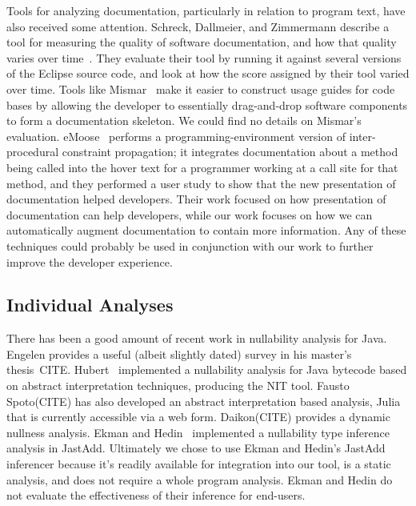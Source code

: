 Tools for analyzing documentation, particularly in relation to program text,
have also received some attention.  Schreck, Dallmeier, and Zimmermann describe
a tool for measuring the quality of software documentation, and how that
quality varies over time~\cite{evolvedoc}. They evaluate their tool by running
it against several versions of the Eclipse source code, and look at how the
score assigned by their tool varied over time.  Tools like Mismar~\cite{mismar} make
it easier to construct usage guides for code bases by allowing the developer to
essentially drag-and-drop software components to form a documentation skeleton.
We could find no details on Mismar's evaluation.
eMoose~\cite{emoose} performs a programming-environment version of
inter-procedural constraint propagation; it integrates
documentation about a method being called into the hover text for a programmer
working at a call site for that method, and they performed a user study to show
that the new presentation of documentation helped developers.  Their work
focused on how presentation of documentation can help developers, while our work
focuses on how we can automatically augment documentation to contain more
information.  Any of these
techniques could probably be used
in conjunction with our work to further improve the developer experience.

\subsection{Individual Analyses}

There has been a good amount of recent work in nullability analysis for Java.
Engelen provides a useful (albeit slightly dated) survey in his master's thesis~CITE.
Hubert~\cite{NIT} implemented a nullability
analysis for Java bytecode based on abstract interpretation
techniques, producing the {\sc NIT} tool.  Fausto Spoto(CITE) has also developed
an abstract interpretation based analysis, Julia that is currently accessible via a web form.
Daikon(CITE) provides a dynamic nullness analysis.
Ekman and Hedin~\cite{NonNullTypeInference} implemented a nullability type
inference analysis in JastAdd.  Ultimately we chose to use 
Ekman and Hedin's JastAdd inferencer because it's readily available for
integration into our tool, is a static analysis, and does not require a whole program
analysis.  Ekman and Hedin do not evaluate the effectiveness of their inference for end-users.

